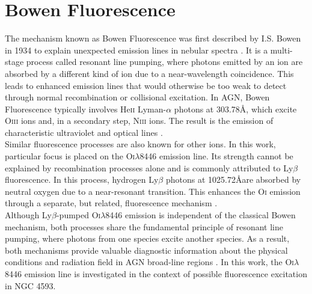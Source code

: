 \section{Bowen Fluorescence}
\label{sec:bowen_fluorescence}

The mechanism known as Bowen Fluorescence was first described by I.S. Bowen in 1934 to explain unexpected emission lines in nebular spectra \parencite{bowen1934}. It is a multi-stage process called resonant line pumping, where photons emitted by an ion are absorbed by a different kind of ion due to a near-wavelength coincidence. This leads to enhanced emission lines that would otherwise be too weak to detect through normal recombination or collisional excitation. In AGN, Bowen Fluorescence typically involves He\textsc{ii} Lyman-$\alpha$ photons at 303.78\AA, which excite O\textsc{iii} ions and, in a secondary step, N\textsc{iii} ions. The result is the emission of characteristic ultraviolet and optical lines \parencite{selvelli2007, baldini2023}.\\
Similar fluorescence processes are also known for other ions. In this work, particular focus is placed on the O\textsc{i}$\lambda$8446 emission line. Its strength cannot be explained by recombination processes alone and is commonly attributed to Ly$\beta$ fluorescence. In this process, hydrogen Ly$\beta$ photons at 1025.72\AA are absorbed by neutral oxygen due to a near-resonant transition. This enhances the O\textsc{i} emission through a separate, but related, fluorescence mechanism \parencite{grandi1980}.\\
Although Ly$\beta$-pumped O\textsc{i}$\lambda$8446 emission is independent of the classical Bowen mechanism, both processes share the fundamental principle of resonant line pumping, where photons from one species excite another species. As a result, both mechanisms provide valuable diagnostic information about the physical conditions and radiation field in AGN broad-line regions \parencite{grandi1980, selvelli2007}. In this work, the O\textsc{i}$\lambda$8446 emission line is investigated in the context of possible fluorescence excitation in NGC 4593.





